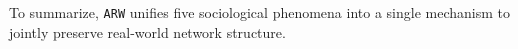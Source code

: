 To summarize, \texttt{ARW} unifies five sociological phenomena
into a single mechanism to jointly preserve real-world network structure.




%
%
%



